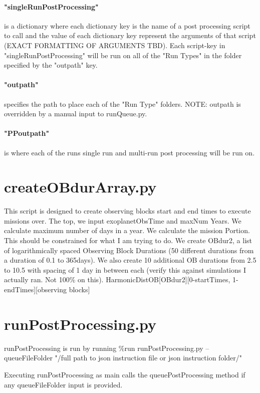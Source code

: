 \documentclass[12pt]{article}
\begin{document}
\paragraph{"singleRunPostProcessing"} is a dictionary where each dictionary key is the name of a post processing script to call and the value of each dictionary key represent the arguments of that script (EXACT FORMATTING OF ARGUMENTS TBD).
Each script-key in "singleRunPostProcessing" will be run on all of the "Run Types" in the folder specified by the "outpath" key.
\paragraph{"outpath"} specifies the path to place each of the "Run Type" folders. NOTE: outpath is overridden by a manual input to runQueue.py.
\paragraph{"PPoutpath"}
is where each of the runs single run and multi-run post processing will be run on.


\section{createOBdurArray.py}
This script is designed to create observing blocks start and end times to execute missions over.
The top, we input exoplanetObsTime and maxNum Years.
We calculate maximum number of days in a year.
We calculate the mission Portion. This should be constrained for what I am trying to do.
We create OBdur2, a list of logarithmically spaced Observing Block Durations (50 different durations from a duration of 0.1 to 365days).
We also create 10 additional OB durations from 2.5 to 10.5 with spacing of 1 day in between each (verify this against simulations I actually ran. Not 100\% on this).
HarmonicDistOB[OBdur2][0-startTimes, 1-endTimes][observing blocks]

\section{runPostProcessing.py}
runPostProcessing is run by running \%run runPostProcessing.py --queueFileFolder "/full path to json instruction file or json instruction folder/"

Executing runPostProcessing as main calls the queuePostProcessing method if any queueFileFolder input is provided.
\end{document}
